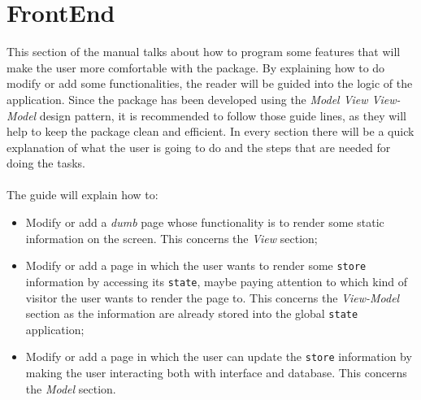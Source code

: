 \section{FrontEnd}
This section of the manual talks about how to program some features that will make the user more comfortable with the package. By explaining how to do modify or add some functionalities, the reader will be guided into the logic of the application.
Since the package has been developed using the \emph{Model View View-Model} design pattern, it is recommended to follow those guide lines, as they will help to keep the package clean and efficient. In every section there will be a quick explanation of what the user is going to do and the steps that are needed for doing the tasks.
~\\~\\The guide will explain how to:
\begin{itemize}
	\item Modify or add a \textit{dumb} page whose functionality is to render some static information on the screen. This concerns the \emph{View} section;
	\item Modify or add a page in which the user wants to render some \verb|store| information by accessing its \verb|state|, maybe paying attention to which kind of visitor the user wants to render the page to. This concerns the \emph{View-Model} section as the information are already stored into the global \verb|state| application;
	\item Modify or add a page in which the user can update the \verb|store| information by making the user interacting both with interface and database. This concerns the \emph{Model} section.
\end{itemize}

